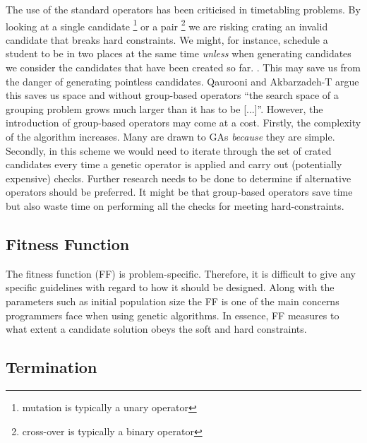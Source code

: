 \documentclass[a4paper, 12pt, titlepage]{article}
\begin{document}
The use of the standard operators has been criticised in timetabling
problems.  By looking at a single candidate \footnote{mutation is typically a unary operator} or a
pair \footnote{cross-over is typically a binary operator} we are risking crating an invalid candidate that breaks
hard constraints. We might, for instance, schedule a student to be in two
places at the same time \emph{unless} when generating candidates we consider the candidates that have been created
so far. \cite[p.~2506]{qaurooni2013}.  This may save us from the danger
of generating pointless candidates. Qaurooni and Akbarzadeh-T argue this
saves us space and without group-based operators ``the search space of a
grouping problem grows much larger than it has to be [...]''.
However, the introduction of group-based operators may come at a cost. Firstly,
the complexity of the algorithm increases.  Many are drawn to
GAs \emph{because} they are simple.  Secondly, in this scheme we
would need to iterate through the set of crated candidates every time a
genetic operator is applied and carry out (potentially expensive) checks.
Further research needs to be done to determine if alternative operators
should be preferred. It might be that group-based operators save time but
also waste time on performing all the checks for meeting hard-constraints.

\subsection*{Fitness Function}

The fitness function (FF) is problem-specific. Therefore, it is difficult
to give any specific guidelines with regard to how it should be
designed. Along with the parameters such as initial population size the
FF is one of the main concerns programmers face when using
genetic algorithms. In essence, FF measures to what
extent a candidate solution obeys the soft and hard constraints.


\subsection*{Termination}

\end{document}
